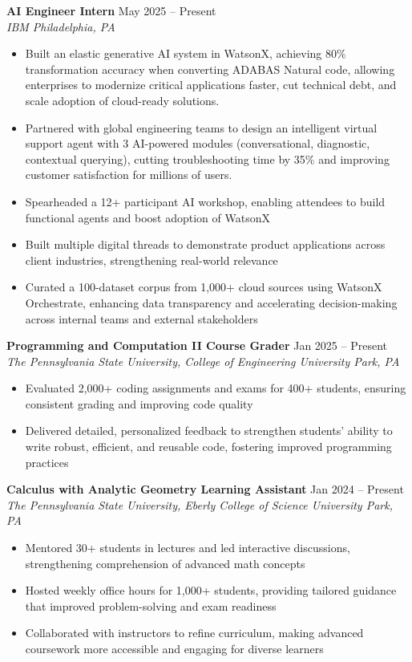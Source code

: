 \documentclass[letterpaper,11pt]{article}
\begin{document}
\normalsize{\textbf{AI Engineer Intern} \hfill May 2025 -- Present} \\
\footnotesize{\textit{IBM \hfill Philadelphia, PA}}
\vspace{-5pt}
\begin{itemize}
  \item Built an elastic generative AI system in WatsonX, achieving 80\% transformation accuracy when converting ADABAS Natural code, allowing enterprises to modernize critical applications faster, cut technical debt, and scale adoption of cloud-ready solutions.
  \item Partnered with global engineering teams to design an intelligent virtual support agent with 3 AI-powered modules (conversational, diagnostic, contextual querying), cutting troubleshooting time by 35\% and improving customer satisfaction for millions of users.
  \item Spearheaded a 12+ participant AI workshop, enabling attendees to build functional agents and boost adoption of WatsonX
  \item Built multiple digital threads to demonstrate product applications across client industries, strengthening real-world relevance
  \item Curated a 100-dataset corpus from 1,000+ cloud sources using WatsonX Orchestrate, enhancing data transparency and accelerating decision-making across internal teams and external stakeholders
\end{itemize}

\normalsize{\textbf{Programming and Computation II Course Grader} \hfill Jan 2025 -- Present} \\
\footnotesize{\textit{The Pennsylvania State University, College of Engineering \hfill University Park, PA}}
\vspace{-5pt}
\begin{itemize}
    \item Evaluated 2,000+ coding assignments and exams for 400+ students, ensuring consistent grading and improving code quality
    \item Delivered detailed, personalized feedback to strengthen students’ ability to write robust, efficient, and reusable code, fostering improved programming practices
\end{itemize}

\normalsize{\textbf{Calculus with Analytic Geometry Learning Assistant} \hfill Jan 2024 -- Present} \\
\footnotesize{\textit{The Pennsylvania State University, Eberly College of Science \hfill University Park, PA}}
\vspace{-5pt}
\begin{itemize}
  \item Mentored 30+ students in lectures and led interactive discussions, strengthening comprehension of advanced math concepts
  \item Hosted weekly office hours for 1,000+ students, providing tailored guidance that improved problem-solving and exam readiness
  \item Collaborated with instructors to refine curriculum, making advanced coursework more accessible and engaging for diverse learners
\end{itemize}
\end{document}

